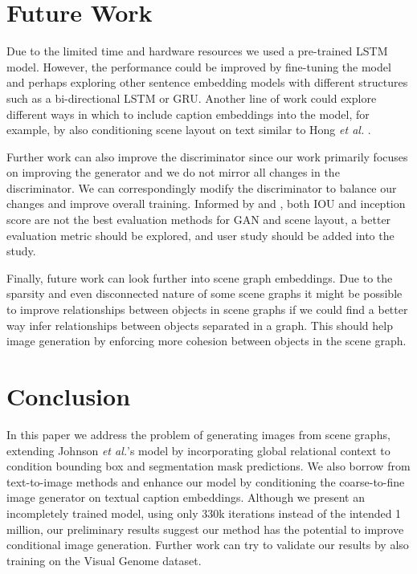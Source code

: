 \documentclass{article}
\begin{document}
\section{Future Work}
Due to the limited time and hardware resources we used a pre-trained LSTM model. However, the performance could be improved by fine-tuning the model and perhaps exploring other sentence embedding models with different structures such as a bi-directional LSTM or GRU. Another line of work could explore different ways in which to include caption embeddings into the model, for example, by also conditioning scene layout on text similar to Hong \textit{et al.} \cite{scenelayout}.

Further work can also improve the discriminator since our work primarily focuses on improving the generator and we do not mirror all changes in the discriminator. We can correspondingly modify the discriminator to balance our changes and improve overall training. Informed by \cite{inceptionscorer} and \cite{sg2imgcontext}, both IOU and inception score are not the best evaluation methods for GAN and scene layout, a better evaluation metric should be explored, and user study should be added into the study.

Finally, future work can look further into scene graph embeddings. Due to the sparsity and even disconnected nature of some scene graphs it might be possible to improve relationships between objects in scene graphs if we could find a better way infer relationships between objects separated in a graph. This should help image generation by enforcing more cohesion between objects in the scene graph.

\section{Conclusion}
In this paper we address the problem of generating images from scene graphs, extending Johnson \textit{et al.}'s model by incorporating global relational context to condition bounding box and segmentation mask predictions. We also borrow from text-to-image methods and enhance our model by conditioning the coarse-to-fine image generator on textual caption embeddings. Although we present an incompletely trained model, using only 330k iterations instead of the intended 1 million, our preliminary results suggest our method has the potential to improve conditional image generation. Further work can try to validate our results by also training on the Visual Genome dataset.
\end{document}
